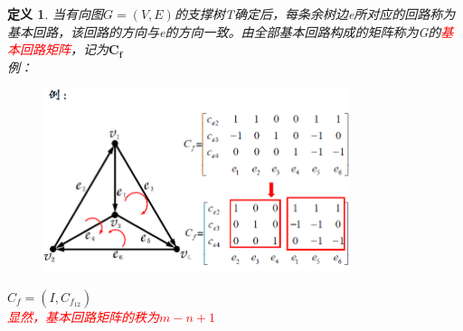 \documentclass[11pt,a4paper,openany]{book}
\newtheorem{defination}{\textbf{定义}}[section]
\begin{document}
\begin{defination}
当有向图$G=(V,E)$的支撑树T确定后，每条余树边e所对应的回路称为基本回路，该回路的方向与e的方向一致。由全部基本回路构成的矩阵称为G的\textcolor{red}{基本回路矩阵}，记为$\mathbf{C_f}$\\
例：
\begin{figure}[H]
  \centering
  \includegraphics[width=0.8\textwidth]{cf.png}\\
  \caption*{}
\end{figure}
$C_f=(I,C_{f_{12}})$\\
\textcolor{red}{显然，基本回路矩阵的秩为$m-n+1$}
\end{defination}
\end{document}
